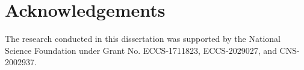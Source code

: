 \chapter*{Acknowledgements}
\thispagestyle{empty}

The research conducted in this dissertation was supported by the  National Science Foundation under Grant No. ECCS-1711823, ECCS-2029027, and CNS-2002937.

\clearpage
